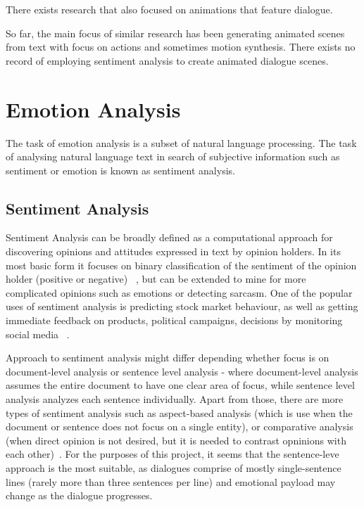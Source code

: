 There exists research that also focused on animations that feature dialogue. ~\cite{animstory}

So far, the main focus of similar research has been generating animated scenes from text with focus on actions and sometimes motion synthesis. There exists no record of employing sentiment analysis to create animated dialogue scenes.




\section{Emotion Analysis}

The task of emotion analysis is a subset of natural language processing. The task of analysing natural language text in search of subjective information such as sentiment or emotion is known as sentiment analysis.

\subsection{Sentiment Analysis}
Sentiment Analysis can be broadly defined as a computational approach for discovering opinions and attitudes expressed in text by opinion holders. In its most basic form it focuses on binary classification of the sentiment of the opinion holder (positive or negative) ~\cite{sentimentanal1}, but can be extended to mine for more complicated opinions such as emotions or detecting sarcasm. One of the popular uses of sentiment analysis is predicting stock market behaviour, as well as getting immediate feedback on products, political campaigns, decisions by monitoring social media ~\cite{sentimentanal2}.

Approach to sentiment analysis might differ depending whether focus is on document-level analysis or sentence level analysis - where document-level analysis assumes the entire document to have one clear area of focus, while sentence level analysis analyzes each sentence individually. Apart from those, there are more types of sentiment analysis such as aspect-based analysis (which is use when the document or sentence does not focus on a single entity), or comparative analysis (when direct opinion is not desired, but it is needed to contrast opninions with each other)~\cite{sentimentanal2}. For the purposes of this project, it seems that the sentence-leve approach is the most suitable, as dialogues comprise of mostly single-sentence lines (rarely more than three sentences per line) and emotional payload may change as the dialogue progresses.

